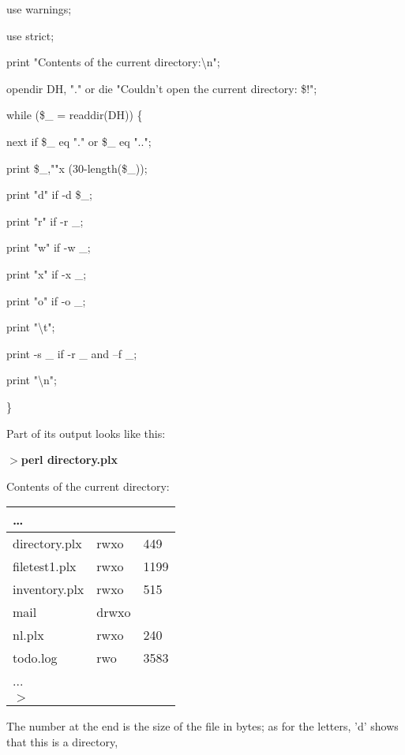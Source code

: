 \documentclass[a4paper,11pt]{book}
\begin{document}
\noindent use warnings;

\noindent use strict;

\noindent 

\noindent print "Contents of the current directory:\textbackslash n";

\noindent opendir DH, "." or die "Couldn't open the current directory: \$!";

\noindent while (\$\_  = readdir(DH)) \{

\noindent next if \$\_  eq "." or \$\_  eq "..";

\noindent print \$\_,""x (30-length(\$\_));

\noindent print "d" if -d \$\_;

\noindent print "r" if -r \_;

\noindent print "w" if -w \_;

\noindent print "x" if -x \_;

\noindent print "o" if -o \_;

\noindent print "\textbackslash t";

\noindent print -s \_  if -r \_  and --f \_;

\noindent print "\textbackslash n";

\noindent \}

\noindent 

\noindent Part of its output looks like this:

\noindent 

\noindent $>$\textbf{perl directory.plx}

\noindent Contents of the current directory:

\begin{tabular}{|p{1.0in}|p{0.5in}|p{0.2in}|} \hline 
\dots  &  &  \\ \hline 
directory.plx & rwxo & 449 \\ \hline 
filetest1.plx & rwxo & 1199 \\ \hline 
inventory.plx & rwxo & 515 \\ \hline 
mail & drwxo &  \\ \hline 
nl.plx & rwxo & 240 \\ \hline 
todo.log & rwo & 3583 \\ \hline 
... &  &  \\ \hline 
$>$ &  &  \\ \hline 
\end{tabular}



\noindent The number at the end is the size of the file in bytes; as for the letters, 'd' shows that this is a directory,
\end{document}
